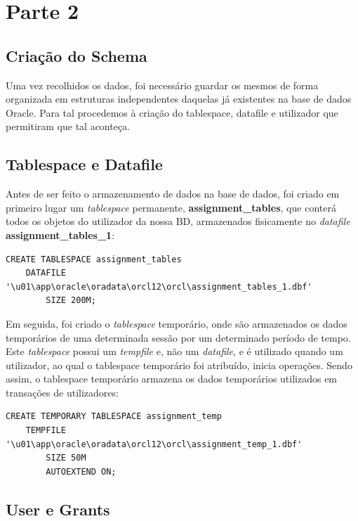 \section*{Parte 2}\label{sec:parte2}
\subsection*{Criação do Schema}

Uma vez recolhidos os dados, foi necessário guardar os mesmos de forma organizada em estruturas independentes daquelas já existentes na base de dados Oracle. Para tal procedemos à criação do tablespace, datafile e utilizador que permitiram que tal aconteça.

\subsection*{Tablespace e Datafile}
 
Antes de ser feito o armazenamento de dados na base de dados, foi criado em primeiro lugar um \textit{tablespace} permanente, \textbf{assignment\_tables}, que conterá todos os objetos do utilizador  da nossa BD, armazenados fisicamente no \textit{datafile} \textbf{assignment\_tables\_1}:

\begin{verbatim}
CREATE TABLESPACE assignment_tables
    DATAFILE '\u01\app\oracle\oradata\orcl12\orcl\assignment_tables_1.dbf'
        SIZE 200M;
\end{verbatim}
  
Em seguida, foi criado o \textit{tablespace} temporário, onde são armazenados os dados temporários de uma determinada sessão por um determinado período de tempo. Este \textit{tablespace} possui um \textit{tempfile} e, não um \textit{datafile}, e é utilizado quando um utilizador, ao qual o tablespace temporário foi atribuído, inicia operações. Sendo assim, o tablespace temporário armazena os dados temporários utilizados em transações de utilizadores:

\begin{verbatim}
CREATE TEMPORARY TABLESPACE assignment_temp
    TEMPFILE '\u01\app\oracle\oradata\orcl12\orcl\assignment_temp_1.dbf'
        SIZE 50M
        AUTOEXTEND ON;
\end{verbatim}

\subsection*{User e Grants}

